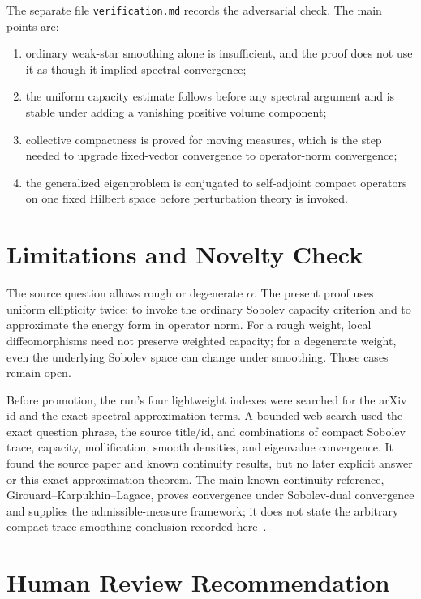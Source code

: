 \documentclass[11pt]{article}
\begin{document}
The separate file \texttt{verification.md} records the adversarial check. The
main points are:
\begin{enumerate}[leftmargin=*]
\item ordinary weak-star smoothing alone is insufficient, and the proof does
not use it as though it implied spectral convergence;
\item the uniform capacity estimate follows before any spectral argument and
is stable under adding a vanishing positive volume component;
\item collective compactness is proved for moving measures, which is the step
needed to upgrade fixed-vector convergence to operator-norm convergence;
\item the generalized eigenproblem is conjugated to self-adjoint compact
operators on one fixed Hilbert space before perturbation theory is invoked.
\end{enumerate}

\section*{Limitations and Novelty Check}

The source question allows rough or degenerate \(\alpha\). The present proof
uses uniform ellipticity twice: to invoke the ordinary Sobolev capacity
criterion and to approximate the energy form in operator norm. For a rough
weight, local diffeomorphisms need not preserve weighted capacity; for a
degenerate weight, even the underlying Sobolev space can change under
smoothing. Those cases remain open.

Before promotion, the run's four lightweight indexes were searched for the
arXiv id and the exact spectral-approximation terms. A bounded web search used
the exact question phrase, the source title/id, and combinations of compact
Sobolev trace, capacity, mollification, smooth densities, and eigenvalue
convergence. It found the source paper and known continuity results, but no
later explicit answer or this exact approximation theorem. The main known
continuity reference, Girouard--Karpukhin--Lagace, proves convergence under
Sobolev-dual convergence and supplies the admissible-measure framework; it
does not state the arbitrary compact-trace smoothing conclusion recorded
here~\cite{GKL}.

\section*{Human Review Recommendation}
\end{document}
